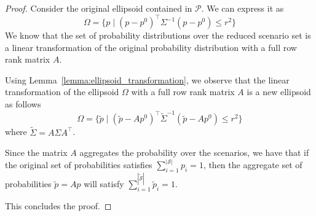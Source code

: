 \documentclass{article}
\newcommand{\mP}{\mathcal{P}}
\newcommand{\mS}{\mathcal{S}}
\begin{document}
	

\lemredellips*


\begin{proof}%
	Consider the original ellipsoid contained in \(\mP\). We can express it as 
	\[
	\Omega = \{ p \mid (p - p^0)^{\top}\Sigma^{-1}(p - p^0) \leq r^2\}
	\]
	We know that the set of probability distributions over the reduced scenario set is a linear transformation of the original probability distribution with a full row rank matrix \(A\). 
	
	Using Lemma~\ref{lemma:ellipsoid_transformation}, we observe that the linear transformation of the ellipsoid \(\Omega\) with a full row rank matrix \(A\) is a new ellipsoid as follows
	\[
	\Omega = \{ \tilde{p} \mid (\tilde{p} - A p^0)^{\top}\tilde{\Sigma}^{-1}(\tilde{p} - A p^0) \leq r^2\}
	\]
	where \(\tilde{\Sigma} = A \Sigma A^{\top}\). 
	
	Since the matrix \(A\) aggregates the probability over the scenarios, we have that if the original set of probabilities satisfies \(\sum_{i=1}^{|\mS|} p_i=1\), then the aggregate set of probabilities \(\tilde{p} = A p\) will satisfy \(\sum_{i=1}^{|\tilde{\mS}|} \tilde{p}_i=1\). 

	This concludes the proof.
\end{proof}
\end{document}
